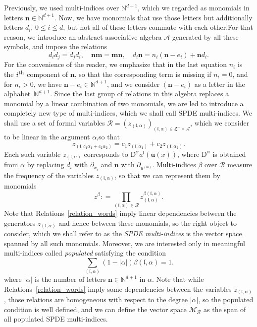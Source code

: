 \documentclass[AHL,Unicode,longabstracts]{cedram}
\newcommand{\bn}{\mathbf{n}}
\newcommand{\bu}{\mathbf{u}}
\newcommand{\bm}{\mathbf{m}}
\newcommand{\mcM}{\mathcal{M}}
\newcommand{\mcR}{\mathcal{R}}
\newcommand{\coord}{\mcR}
\newcommand{\cA}{\mathcal{A}}
\newcommand{\mfl}{\mathfrak{l}}
\newcommand{\mfL}{\mathfrak{L}}
\newcommand{\bbN}{\mathbb{N}}
\newcommand{\rmD}{\mathrm{D}}
\begin{document}
Previously, we used multi-indices over $\bbN^{d+1}$, which we regarded as monomials in letters $\bn\in\bbN^{d+1}$. Now, we have monomials that use those letters but additionally letters $d_i$, $0\le i\le d$, but not all of these letters commute with each other.\linebreak For that reason, we introduce an abstract associative algebra $\cA$ generated by all these symbols, and impose the relations
\begin{equation}\label{relation_words}
d_id_j=d_jd_i,\quad \bn\bm=\bm\bn,\quad d_i \bn = n_i(\bn-e_i) + \bn d_i.
\end{equation}
For the convenience of the reader, we emphasize that in the last equation $n_i$ is the $i^{\rm th}$ component of $\bn$, so that the corresponding term is missing if $n_i=0$, and for $n_i>0$, we have $\bn-e_i\in\bbN^{d+1}$, and we consider $(\bn-e_i)$ as a letter in the alphabet~$\bbN^{d+1}$. Since the last group of relations in this algebra replaces a monomial by a linear combination of two monomials, we are led to introduce a completely new type of multi-indices, which we shall call SPDE multi-indices. We shall use a set of formal variables $\coord=(z_{(\mfl,\alpha)})_{(\mfl,\alpha) \in \mfL^-\times\cA}$, which we consider to be linear in the argument $\alpha$,\linebreak so that
\[
z_{(\mfl,c_1\alpha_1+c_2\alpha_2)}=c_1z_{(\mfl,\alpha_1)}+c_2z_{(\mfl,\alpha_2)}.
\]
Each such variable $ z_{(\mfl,\alpha)} $ corresponds to $\rmD^{\alpha} a^\mfl(\bu(x))$, where $\rmD^\alpha$ is obtained from $\alpha$ by replacing $d_i$ with $\partial_{x_i}$ and $\bn$ with $\partial_{u^{(\bn)}}$. Multi-indices $\beta$ over $\coord$ measure the frequency of the variables $ z_{(\mfl,\alpha)} $, so that we can represent them by monomials
\begin{equation*}
z^{\beta} : = \prod_{(\mfl,\alpha) \in \coord} z_{(\mfl,\alpha)}^{\beta(\mfl,\alpha)}.
\end{equation*}
Note that Relations~\eqref{relation_words} imply linear dependencies between the generators $z_{(\mfl,\alpha)}$ and hence between these monomials, so the right object to consider, which we shall refer to as the \emph{SPDE multi-indices} is the vector space spanned by all such monomials. Moreover, we are interested only in meaningful multi-indices called \emph{populated} satisfying the condition
\begin{equation}\label{populated}
\sum_{(\mfl,\alpha)} (1 - |\alpha|)\beta(\mfl,\alpha) = 1.
\end{equation}
where $|\alpha|$ is the number of letters $\bn\in\bbN^{d+1}$ in $\alpha$. Note that while Relations~\eqref{relation_words} imply some dependencies between the variables $z_{(\mfl,\alpha)}$, those relations are homogeneous with respect to the degree $|\alpha|$, so the populated condition is well defined, and we can define the vector space $\mcM_{\mcR}$ as the span of all populated SPDE multi-indices.
\end{document}
